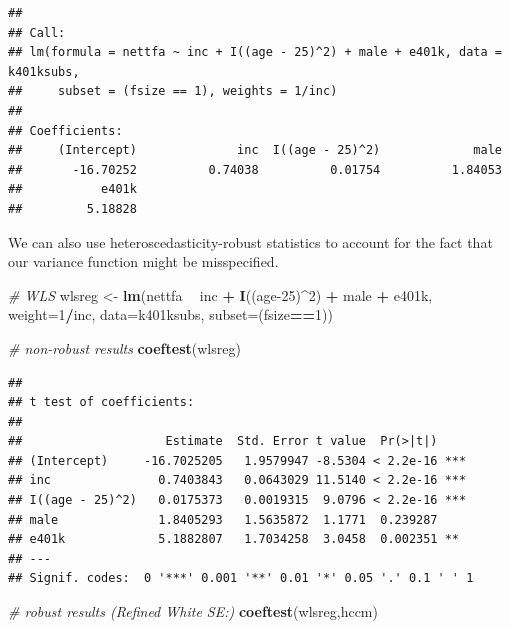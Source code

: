 \documentclass[]{book}
\newenvironment{Shaded}{\begin{snugshade}}{\end{snugshade}}
\newcommand{\CommentTok}[1]{\textcolor[rgb]{0.56,0.35,0.01}{\textit{#1}}}
\newcommand{\DataTypeTok}[1]{\textcolor[rgb]{0.13,0.29,0.53}{#1}}
\newcommand{\DecValTok}[1]{\textcolor[rgb]{0.00,0.00,0.81}{#1}}
\newcommand{\KeywordTok}[1]{\textcolor[rgb]{0.13,0.29,0.53}{\textbf{#1}}}
\newcommand{\NormalTok}[1]{#1}
\newcommand{\OperatorTok}[1]{\textcolor[rgb]{0.81,0.36,0.00}{\textbf{#1}}}
\newcommand{\StringTok}[1]{\textcolor[rgb]{0.31,0.60,0.02}{#1}}
\begin{document}
\begin{verbatim}
## 
## Call:
## lm(formula = nettfa ~ inc + I((age - 25)^2) + male + e401k, data = k401ksubs, 
##     subset = (fsize == 1), weights = 1/inc)
## 
## Coefficients:
##     (Intercept)              inc  I((age - 25)^2)             male  
##       -16.70252          0.74038          0.01754          1.84053  
##           e401k  
##         5.18828
\end{verbatim}

We can also use heteroscedasticity-robust statistics to account for the fact that our variance function might be misspecified.

\begin{Shaded}
\begin{Highlighting}[]
\CommentTok{# WLS}
\NormalTok{wlsreg <-}\StringTok{ }\KeywordTok{lm}\NormalTok{(nettfa }\OperatorTok{~}\StringTok{ }\NormalTok{inc }\OperatorTok{+}\StringTok{ }\KeywordTok{I}\NormalTok{((age}\DecValTok{-25}\NormalTok{)}\OperatorTok{^}\DecValTok{2}\NormalTok{) }\OperatorTok{+}\StringTok{ }\NormalTok{male }\OperatorTok{+}\StringTok{ }\NormalTok{e401k, }
             \DataTypeTok{weight=}\DecValTok{1}\OperatorTok{/}\NormalTok{inc, }\DataTypeTok{data=}\NormalTok{k401ksubs, }\DataTypeTok{subset=}\NormalTok{(fsize}\OperatorTok{==}\DecValTok{1}\NormalTok{))}

\CommentTok{# non-robust results}
\KeywordTok{coeftest}\NormalTok{(wlsreg)}
\end{Highlighting}
\end{Shaded}

\begin{verbatim}
## 
## t test of coefficients:
## 
##                    Estimate  Std. Error t value  Pr(>|t|)    
## (Intercept)     -16.7025205   1.9579947 -8.5304 < 2.2e-16 ***
## inc               0.7403843   0.0643029 11.5140 < 2.2e-16 ***
## I((age - 25)^2)   0.0175373   0.0019315  9.0796 < 2.2e-16 ***
## male              1.8405293   1.5635872  1.1771  0.239287    
## e401k             5.1882807   1.7034258  3.0458  0.002351 ** 
## ---
## Signif. codes:  0 '***' 0.001 '**' 0.01 '*' 0.05 '.' 0.1 ' ' 1
\end{verbatim}

\begin{Shaded}
\begin{Highlighting}[]
\CommentTok{# robust results (Refined White SE:)}
\KeywordTok{coeftest}\NormalTok{(wlsreg,hccm)}
\end{Highlighting}
\end{Shaded}
\end{document}
